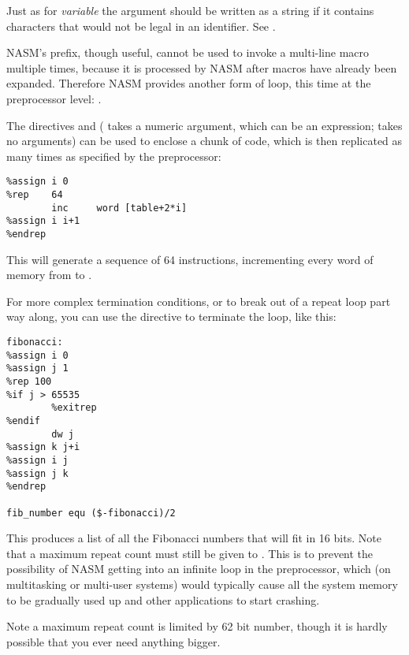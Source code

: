 Just as for \emph{variable} the argument should be written as a
string if it contains characters that would not be legal in an
identifier. See .


NASM's  prefix, though useful, cannot be used to invoke a
multi-line macro multiple times, because it is processed by NASM
after macros have already been expanded. Therefore NASM provides
another form of loop, this time at the preprocessor level: .

The directives  and  (
takes a numeric argument, which can be an expression; 
takes no arguments) can be used to enclose a chunk of code, which is then
replicated as many times as specified by the preprocessor:

\begin{lstlisting}
%assign i 0
%rep    64
        inc     word [table+2*i]
%assign i i+1
%endrep
\end{lstlisting}

This will generate a sequence of 64  instructions,
incrementing every word of memory from \code{[table]} to
\code{[table+126]}.

For more complex termination conditions, or to break out of a repeat
loop part way along, you can use the  directive to
terminate the loop, like this:

\begin{lstlisting}
fibonacci:
%assign i 0
%assign j 1
%rep 100
%if j > 65535
        %exitrep
%endif
        dw j
%assign k j+i
%assign i j
%assign j k
%endrep

fib_number equ ($-fibonacci)/2
\end{lstlisting}

This produces a list of all the Fibonacci numbers that will fit in
16 bits. Note that a maximum repeat count must still be given to
. This is to prevent the possibility of NASM getting into an
infinite loop in the preprocessor, which (on multitasking or
multi-user systems) would typically cause all the system memory to
be gradually used up and other applications to start crashing.

Note a maximum repeat count is limited by 62 bit number, though it
is hardly possible that you ever need anything bigger.


